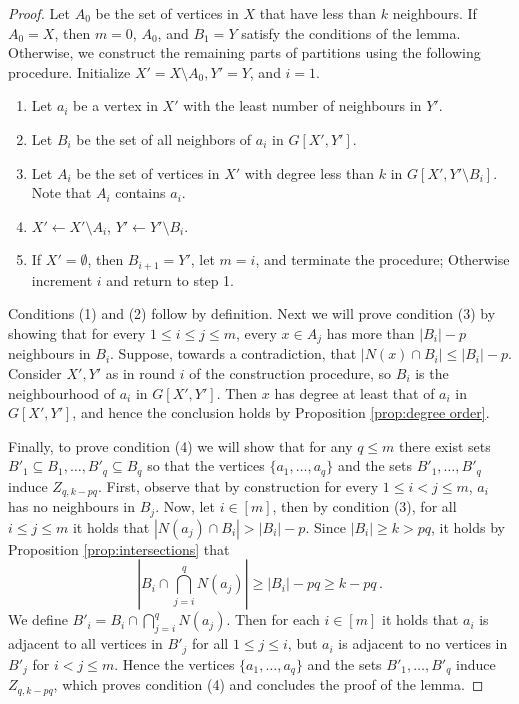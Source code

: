 \documentclass{article}
\begin{document}
\begin{proof}
	Let $A_0$ be the set of vertices in $X$ that have less than $k$ neighbours. If $A_0 = X$, then
	$m=0$, $A_0$, and $B_1 = Y$ satisfy the conditions of the lemma.
	Otherwise, we construct the remaining parts of partitions using the following procedure.
	Initialize $X' = X \setminus A_0, Y'=Y$, and $i=1$.
	\begin{enumerate}
		\item Let $a_i$ be a vertex in $X'$ with the least number of neighbours in $Y'$.
		\item Let $B_i$ be the set of all neighbors of $a_i$ in $G[X',Y']$.
		\item Let $A_i$ be the set of vertices in $X'$ with degree less than $k$ in $G[X',Y'\setminus B_i]$.
		Note that $A_i$ contains $a_i$.
		\item $X' \gets X' \setminus A_i$, $Y' \gets Y' \setminus B_i$.
		\item If $X' = \emptyset$, then $B_{i+1} = Y'$, let $m=i$, and terminate the procedure;
		Otherwise increment $i$ and return to step 1.
	\end{enumerate}
	
	\noindent
	Conditions (1) and (2) follow by definition. Next we will prove condition (3) by showing 
	that for every $1 \leq i \leq j \leq m$, every $x \in A_j$ has more than $|B_i| - p$ neighbours in $B_i$.
	Suppose, towards a contradiction, that $|N(x) \cap B_i| \leq |B_i|-p$. Consider $X',Y'$ as in round $i$ of
	the construction procedure, so $B_i$ is the neighbourhood of $a_i$ in $G[X',Y']$. 
	Then $x$ has degree at least that of $a_i$ in $G[X',Y']$, and hence the conclusion holds by 
	Proposition \ref{prop:degree order}.

	Finally, to prove condition (4) we will show that for any $q \leq m$ there exist sets $B'_1 \subseteq B_1, \dotsc, B'_q \subseteq B_q$ so that the vertices $\{a_1, \dotsc, a_q\}$ and the sets $B'_1, \dotsc, B'_q$ induce $Z_{q,k-pq}$.
	First, observe that by construction for every $1 \leq i < j \leq m$, $a_i$ has no neighbours in $B_j$.
	Now, let $i \in [m]$, then by condition (3), for all $i \leq j \leq m$ it holds that $|N(a_j) \cap B_i| > |B_i|-p$.
	Since $|B_i| \geq k > pq$, it holds by Proposition \ref{prop:intersections} that
	\[
		\left|B_i \cap \bigcap_{j=i}^q N(a_j)\right| \geq |B_i| - pq \geq k-pq \,.
	\]
	We define $B'_i = B_i \cap \bigcap_{j=i}^q N(a_j)$.
	Then for each $i \in[m]$ it holds that $a_i$ is adjacent to all vertices in $B'_j$ for all $1 \leq j \leq i$, but $a_i$ is adjacent to no vertices in $B'_j$ for $i < j \leq m$. Hence the vertices $\{a_1, \dotsc, a_q\}$ and the sets $B'_1, \dotsc, B'_q$ induce $Z_{q,k-pq}$, which proves condition (4) and 
	concludes the proof of the lemma.
\end{proof}
\end{document}
